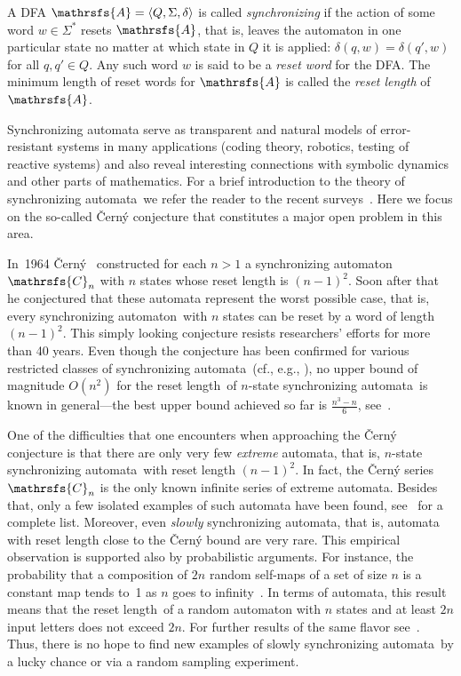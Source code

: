 \documentclass[11pt]{llncs}
\newcommand{\sa}{synchronizing automata}
\newcommand{\san}{synchronizing automaton}
\newcommand{\rl}{reset length}
\begin{document}
A DFA $\mathrsfs{A}=\langle Q,\Sigma,\delta\rangle$ is called
\emph{synchronizing} if the action of some word $w\in\Sigma^*$
resets $\mathrsfs{A}$, that is, leaves the automaton in one
particular state no matter at which state in $Q$ it is applied:
$\delta(q,w)=\delta(q',w)$ for all $q,q'\in Q$. Any such word $w$
is said to be a \emph{reset word} for the DFA. The minimum length
of reset words for $\mathrsfs{A}$ is called the \emph{\rl} of
$\mathrsfs{A}$.

Synchronizing automata serve as transparent and natural models of
error-resistant systems in many applications (coding theory, robotics,
testing of reactive systems) and also reveal interesting connections
with symbolic dynamics and other parts of mathematics. For a brief
introduction to the theory of \sa\ we refer the reader to the recent
surveys~\cite{Sa05,Vo08}. Here we focus on the so-called \v{C}ern\'{y}
conjecture that constitutes a major open problem in this area.

In~1964 \v{C}ern\'{y}~\cite{Ce64} constructed for each $n>1$ a \san\
$\mathrsfs{C}_n$ with $n$ states whose reset length is $(n-1)^2$.
Soon after that he conjectured that these automata represent
the worst possible case, that is, every \san\ with $n$ states
can be reset by a word of length $(n-1)^2$. This simply looking conjecture
resists researchers' efforts for more than 40 years. Even though the
conjecture has been confirmed for various restricted classes of \sa\
(cf., e.g., \cite{Ep90,Du98,Ka03,Tr07,Tr08,AS09,Vo09}), no upper bound of magnitude
$O(n^2)$ for the \rl\ of $n$-state \sa\ is known in general---the best upper
bound achieved so far is $\frac{n^3-n}6$, see~\cite{Pi83}.

One of the difficulties that one encounters when approaching the \v{C}ern\'{y}
conjecture is that there are only very few \emph{extreme} automata, that is,
$n$-state \sa\ with reset length $(n-1)^2$. In fact, the \v{C}ern\'{y} series
$\mathrsfs{C}_n$ is the only known infinite series of extreme automata. Besides
that, only a few isolated examples of such automata have been found, see~\cite{Vo08}
for a complete list. Moreover, even \emph{slowly} \sa, that is, automata with reset
length close to the \v{C}ern\'{y} bound are very rare. This empirical observation
is supported also by probabilistic arguments. For instance, the probability that
a composition of $2n$ random self-maps of a set of size $n$ is a constant map
tends to~1 as $n$ goes to infinity~\cite{Hi88}. In terms of automata, this
result means that the \rl\ of a random automaton with $n$ states and at least
$2n$ input letters does not exceed $2n$. For further results of the same
flavor see~\cite{SZ}. Thus, there is no hope to find new examples of slowly
\sa\ by a lucky chance or via a random sampling experiment.
\end{document}

